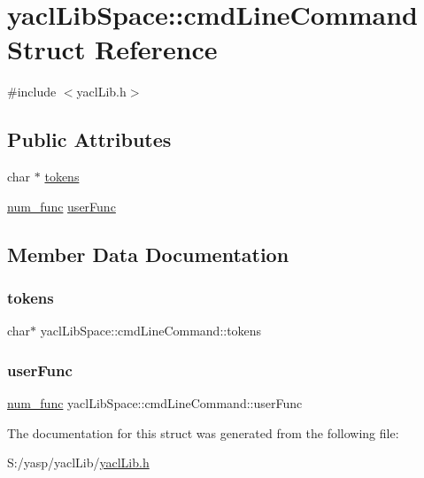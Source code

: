 \hypertarget{structyacl_lib_space_1_1cmd_line_command}{}\section{yacl\+Lib\+Space\+::cmd\+Line\+Command Struct Reference}
\label{structyacl_lib_space_1_1cmd_line_command}


{\ttfamily \#include $<$yacl\+Lib.\+h$>$}

\subsection*{Public Attributes}
\begin{DoxyCompactItemize}
\item 
char $\ast$ \mbox{\hyperlink{structyacl_lib_space_1_1cmd_line_command_aece318f7b2dc6b9ab16edaefb3466a66}{tokens}}
\item 
\mbox{\hyperlink{namespaceyacl_lib_space_abe18da2116a229caa63a12870966ac35}{num\+\_\+func}} \mbox{\hyperlink{structyacl_lib_space_1_1cmd_line_command_aa830758c483f8bb779522e92295f1ea0}{user\+Func}}
\end{DoxyCompactItemize}


\subsection{Member Data Documentation}
\mbox{\label{structyacl_lib_space_1_1cmd_line_command_aece318f7b2dc6b9ab16edaefb3466a66}} 
\subsubsection{\texorpdfstring{tokens}{tokens}}
{\footnotesize\ttfamily char$\ast$ yacl\+Lib\+Space\+::cmd\+Line\+Command\+::tokens}

\mbox{\label{structyacl_lib_space_1_1cmd_line_command_aa830758c483f8bb779522e92295f1ea0}} 
\subsubsection{\texorpdfstring{userFunc}{userFunc}}
{\footnotesize\ttfamily \mbox{\hyperlink{namespaceyacl_lib_space_abe18da2116a229caa63a12870966ac35}{num\+\_\+func}} yacl\+Lib\+Space\+::cmd\+Line\+Command\+::user\+Func}



The documentation for this struct was generated from the following file\+:\begin{DoxyCompactItemize}
\item 
S\+:/yasp/yacl\+Lib/\mbox{\hyperlink{yacl_lib_8h}{yacl\+Lib.\+h}}\end{DoxyCompactItemize}
